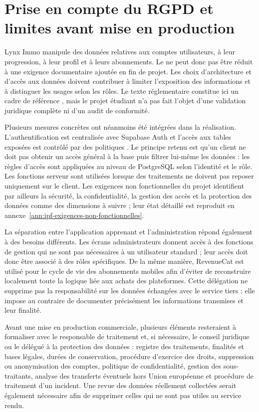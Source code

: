 \section{Prise en compte du RGPD et limites avant mise en production}

Lynx Immo manipule des données relatives aux comptes utilisateurs, à leur progression, à leur profil et à leurs abonnements. Le  ne peut donc pas être réduit à une exigence documentaire ajoutée en fin de projet. Les choix d'architecture et d'accès aux données doivent contribuer à limiter l'exposition des informations et à distinguer les usages selon les rôles. Le texte réglementaire constitue ici un cadre de référence \parencite{rgpd-text}, mais le projet étudiant n'a pas fait l'objet d'une validation juridique complète ni d'un audit de conformité.

Plusieurs mesures concrètes ont néanmoins été intégrées dans la réalisation. L'authentification est centralisée avec Supabase Auth et l'accès aux tables exposées est contrôlé par des politiques . Le principe retenu est qu'un client ne doit pas obtenir un accès général à la base puis filtrer lui-même les données : les règles d'accès sont appliquées au niveau de PostgreSQL selon l'identité et le rôle. Les fonctions serveur sont utilisées lorsque des traitements ne doivent pas reposer uniquement sur le client. Les exigences non fonctionnelles du projet identifient par ailleurs la sécurité, la confidentialité, la gestion des accès et la protection des données comme des dimensions à suivre ; leur état détaillé est reproduit en annexe~\ref{ann:ipf-exigences-non-fonctionnelles}.

La séparation entre l'application apprenant et l'administration répond également à des besoins différents. Les écrans administrateurs donnent accès à des fonctions de gestion qui ne sont pas nécessaires à un utilisateur standard ; leur accès doit donc être associé à des rôles spécifiques. De la même manière, RevenueCat est utilisé pour le cycle de vie des abonnements mobiles afin d'éviter de reconstruire localement toute la logique liée aux achats des plateformes. Cette délégation ne supprime pas la responsabilité sur les données échangées avec le service tiers : elle impose au contraire de documenter précisément les informations transmises et leur finalité.

Avant une mise en production commerciale, plusieurs éléments resteraient à formaliser avec le responsable de traitement et, si nécessaire, le conseil juridique ou le délégué à la protection des données : registre des traitements, finalités et bases légales, durées de conservation, procédure d'exercice des droits, suppression ou anonymisation des comptes, politique de confidentialité, gestion des sous-traitants, analyse des transferts éventuels hors Union européenne et procédure de traitement d'un incident. Une revue des données réellement collectées serait également nécessaire afin de supprimer celles qui ne sont pas utiles au service rendu.

